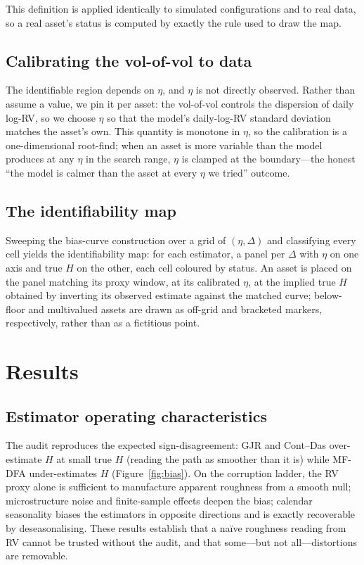 \documentclass[11pt]{article}
\begin{document}
This definition is applied identically to simulated configurations and to real
data, so a real asset's status is computed by exactly the rule used to draw the map.

\subsection{Calibrating the vol-of-vol to data}

The identifiable region depends on $\eta$, and $\eta$ is not directly observed.
Rather than assume a value, we pin it per asset: the vol-of-vol controls the
dispersion of daily log-RV, so we choose $\eta$ so that the model's daily-log-RV
standard deviation matches the asset's own. This quantity is monotone in $\eta$, so
the calibration is a one-dimensional root-find; when an asset is more variable than
the model produces at any $\eta$ in the search range, $\eta$ is clamped at the
boundary---the honest ``the model is calmer than the asset at every $\eta$ we
tried'' outcome.

\subsection{The identifiability map}

Sweeping the bias-curve construction over a grid of $(\eta, \Delta)$ and classifying
every cell yields the identifiability map: for each estimator, a panel per $\Delta$
with $\eta$ on one axis and true $H$ on the other, each cell coloured by status. An
asset is placed on the panel matching its proxy window, at its calibrated $\eta$, at
the implied true $H$ obtained by inverting its observed estimate against the matched
curve; below-floor and multivalued assets are drawn as off-grid and bracketed
markers, respectively, rather than as a fictitious point.

\section{Results}

\subsection{Estimator operating characteristics}

The audit reproduces the expected sign-disagreement: GJR and Cont--Das over-estimate
$H$ at small true $H$ (reading the path as smoother than it is) while MF-DFA
under-estimates $H$ (Figure~\ref{fig:bias}).
On the corruption ladder, the RV proxy alone is sufficient to manufacture apparent
roughness from a smooth null; microstructure noise and finite-sample effects deepen
the bias; calendar seasonality biases the estimators in opposite directions and is
exactly recoverable by deseasonalising. These results establish that a na\"ive
roughness reading from RV cannot be trusted without the audit, and that some---but
not all---distortions are removable.
\end{document}
